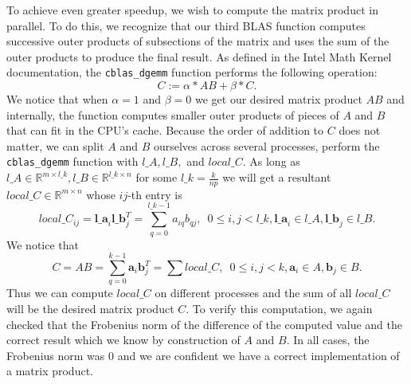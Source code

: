 \documentclass[11pt]{article}
\begin{document}
To achieve even greater speedup, we wish to compute the matrix product in parallel. To do this, we recognize that our third BLAS function computes successive outer products of subsections of the matrix and uses the sum of the outer products to produce the final result. As defined in the Intel Math Kernel documentation, the \texttt{cblas\_dgemm} function performs the following operation:
$$ C := \alpha*AB + \beta*C. $$
We notice that when $\alpha=1$ and $\beta=0$ we get our desired matrix product $AB$ and internally, the function computes smaller outer products of pieces of $A$ and $B$ that can fit in the CPU's cache. Because the order of addition to $C$ does not matter, we can split $A$ and $B$ ourselves across several processes, perform the \texttt{cblas\_dgemm} function with $l\_A, l\_B,$ and $local\_C$. As long as $l\_A \in \mathbb{R}^{m \times l\_k}, l\_B \in \mathbb{R}^{l\_k \times n}$ for some $l\_k=\frac{k}{np}$ we will get a resultant $local\_C \in \mathbb{R}^{m \times n}$ whose $ij$-th entry is
$$ local\_C_{ij} = \mathbf{l\_a}_i \mathbf{l\_b}_j^T = \sum_{q=0}^{l\_k-1} {a_{iq}b_{qj}}, \enspace 0 \leq i,j < l\_k, \mathbf{l\_a}_{i} \in l\_A, \mathbf{l\_b}_{j} \in l\_B. $$
We notice that
$$ C = AB = \sum_{q=0}^{k-1} {\mathbf{a}_{i}\mathbf{b}_{j}^{T}} = \sum {local\_C}, \enspace 0 \leq i,j < k, \mathbf{a}_i\in A, \mathbf{b}_j \in B.$$
Thus we can compute $local\_C$ on different processes and the sum of all $local\_C$ will be the desired matrix product $C$. To verify this computation, we again checked that the Frobenius norm of the difference of the computed value and the correct result which we know by construction of $A$ and $B$. In all cases, the Frobenius norm was $0$ and we are confident we have a correct implementation of a matrix product.
\end{document}
